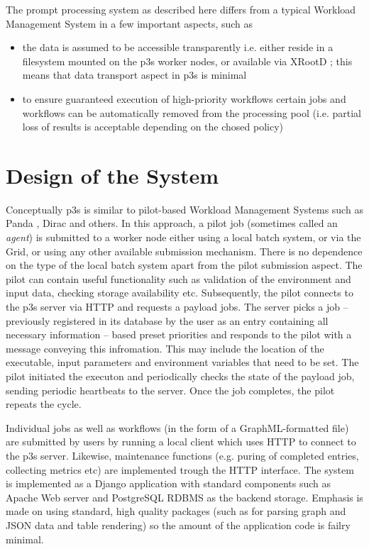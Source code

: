 \documentclass{PoS}
\begin{document}
\noindent The prompt processing system as described here differs from a typical Workload Management System in a few important
aspects, such as
\begin{itemize}
\item the data is assumed to be accessible transparently i.e. either reside in a filesystem mounted on the p3s worker nodes,
or available via XRootD \cite{xrootd}; this means that data transport aspect in p3s is minimal

\item to ensure guaranteed execution of high-priority workflows certain jobs and workflows can be automatically
removed from the processing pool (i.e. partial loss of results is acceptable depending on the chosed policy)

\end{itemize}

\section{Design of the System}
Conceptually p3s is similar to pilot-based Workload Management Systems such as Panda \cite{panda}, Dirac \cite{dirac} and others. In this approach,
a pilot job (sometimes called an \textit{agent}) is submitted to a worker node either using a local batch system, or via the Grid, or using
any other available submission mechanism. There is no dependence on the type of the local batch system apart from the pilot
submission aspect. The pilot can contain useful functionality such as validation of the environment and input data, checking
storage availability etc. Subsequently, the pilot connects to the p3s server via HTTP and requests a payload jobs. The server
picks a job -- previously registered in its database by the user as an entry containing all necessary information -- based preset priorities
and responds to the pilot with a message conveying this infromation. This may include the location of the executable, input parameters
and environment variables that need to be set. The pilot initiated the executon and periodically checks the state of the payload
job, sending periodic heartbeats to the server. Once the job completes, the pilot repeats the cycle.

Individual jobs as well as workflows (in the form of a GraphML-formatted file) are submitted by users
by running a local client which uses HTTP to connect to the p3s server. Likewise, maintenance functions
(e.g. puring of completed entries, collecting metrics etc) are implemented trough the HTTP interface.
The system is implemented as a Django \cite{django} application with standard components such as Apache Web server
and PostgreSQL RDBMS as the backend storage. Emphasis is made on using standard, high quality packages
(such as for parsing graph and JSON data and table rendering) so the amount of the application code is
failry minimal.
\end{document}

